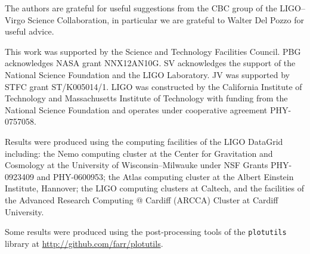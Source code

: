 \acknowledgements

The authors are grateful for useful suggestions from the CBC group of the LIGO--Virgo Science Collaboration, in particular we are grateful to Walter Del Pozzo for useful advice.

This work was supported by the Science and Technology Facilities Council. PBG acknowledges NASA grant NNX12AN10G. SV acknowledges the support of the National Science Foundation and the LIGO Laboratory. JV was supported by STFC grant ST/K005014/1. LIGO was constructed by the California Institute of Technology and Massachusetts Institute of Technology with funding from the National Science Foundation and operates under cooperative agreement PHY-0757058.

Results were produced using the computing facilities of the LIGO DataGrid including: the Nemo computing cluster at the Center for Gravitation and Cosmology at the University of Wisconsin--Milwauke under NSF Grants PHY-0923409 and PHY-0600953; the Atlas computing cluster at the Albert Einstein Institute, Hannover; the LIGO computing clusters at Caltech, and the facilities of the Advanced Research Computing @ Cardiff (ARCCA) Cluster at Cardiff University.

Some results were produced using the post-processing tools of the \texttt{plotutils} library at \url{http://github.com/farr/plotutils}.
  